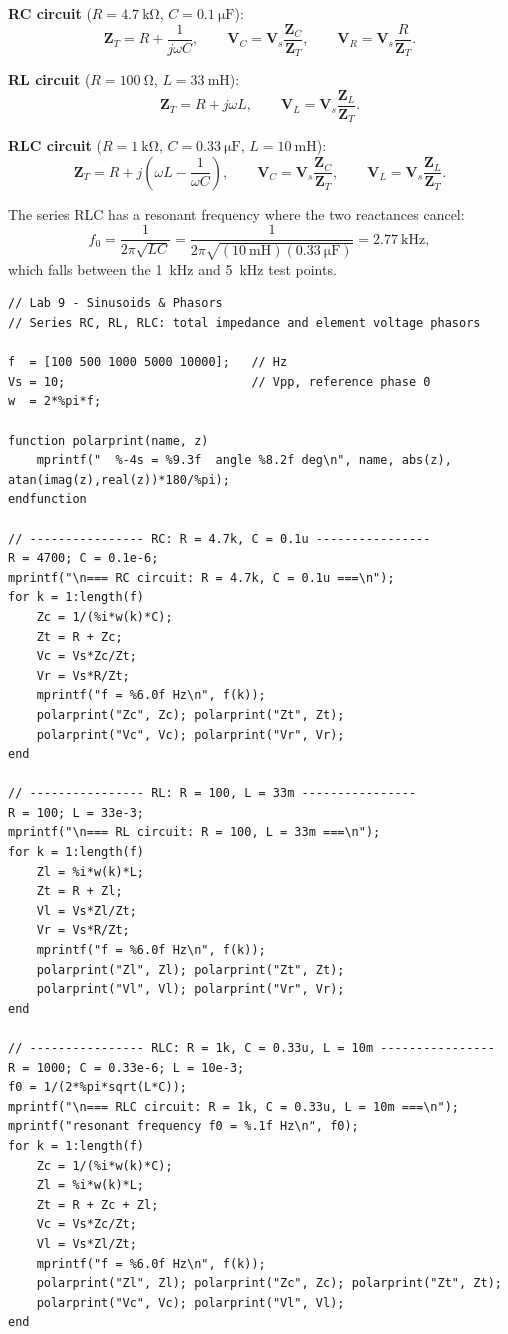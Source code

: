 \documentclass[11pt]{article}
\begin{document}
\noindent\textbf{RC circuit} ($R = \SI{4.7}{\kilo\ohm}$, $C = \SI{0.1}{\micro\farad}$):
\[
    \mathbf{Z}_T = R + \frac{1}{j\omega C},
    \qquad
    \mathbf{V}_C = \mathbf{V}_s \frac{\mathbf{Z}_C}{\mathbf{Z}_T},
    \qquad
    \mathbf{V}_R = \mathbf{V}_s \frac{R}{\mathbf{Z}_T}.
\]

\noindent\textbf{RL circuit} ($R = \SI{100}{\ohm}$, $L = \SI{33}{\milli\henry}$):
\[
    \mathbf{Z}_T = R + j\omega L,
    \qquad
    \mathbf{V}_L = \mathbf{V}_s \frac{\mathbf{Z}_L}{\mathbf{Z}_T}.
\]

\noindent\textbf{RLC circuit} ($R = \SI{1}{\kilo\ohm}$, $C = \SI{0.33}{\micro\farad}$,
$L = \SI{10}{\milli\henry}$):
\[
    \mathbf{Z}_T = R + j\!\left(\omega L - \frac{1}{\omega C}\right),
    \qquad
    \mathbf{V}_C = \mathbf{V}_s \frac{\mathbf{Z}_C}{\mathbf{Z}_T},
    \qquad
    \mathbf{V}_L = \mathbf{V}_s \frac{\mathbf{Z}_L}{\mathbf{Z}_T}.
\]

The series RLC has a resonant frequency where the two reactances cancel:
\[
    f_0 = \frac{1}{2\pi\sqrt{LC}}
        = \frac{1}{2\pi\sqrt{(\SI{10}{\milli\henry})(\SI{0.33}{\micro\farad})}}
        = \SI{2.77}{\kilo\hertz},
\]
which falls between the \SI{1}{\kilo\hertz} and \SI{5}{\kilo\hertz} test points.

\begin{lstlisting}[style=scilab, caption={SciLab program: theoretical impedances and phasor voltages}]
// Lab 9 - Sinusoids & Phasors
// Series RC, RL, RLC: total impedance and element voltage phasors

f  = [100 500 1000 5000 10000];   // Hz
Vs = 10;                          // Vpp, reference phase 0
w  = 2*%pi*f;

function polarprint(name, z)
    mprintf("  %-4s = %9.3f  angle %8.2f deg\n", name, abs(z), atan(imag(z),real(z))*180/%pi);
endfunction

// ---------------- RC: R = 4.7k, C = 0.1u ----------------
R = 4700; C = 0.1e-6;
mprintf("\n=== RC circuit: R = 4.7k, C = 0.1u ===\n");
for k = 1:length(f)
    Zc = 1/(%i*w(k)*C);
    Zt = R + Zc;
    Vc = Vs*Zc/Zt;
    Vr = Vs*R/Zt;
    mprintf("f = %6.0f Hz\n", f(k));
    polarprint("Zc", Zc); polarprint("Zt", Zt);
    polarprint("Vc", Vc); polarprint("Vr", Vr);
end

// ---------------- RL: R = 100, L = 33m ----------------
R = 100; L = 33e-3;
mprintf("\n=== RL circuit: R = 100, L = 33m ===\n");
for k = 1:length(f)
    Zl = %i*w(k)*L;
    Zt = R + Zl;
    Vl = Vs*Zl/Zt;
    Vr = Vs*R/Zt;
    mprintf("f = %6.0f Hz\n", f(k));
    polarprint("Zl", Zl); polarprint("Zt", Zt);
    polarprint("Vl", Vl); polarprint("Vr", Vr);
end

// ---------------- RLC: R = 1k, C = 0.33u, L = 10m ----------------
R = 1000; C = 0.33e-6; L = 10e-3;
f0 = 1/(2*%pi*sqrt(L*C));
mprintf("\n=== RLC circuit: R = 1k, C = 0.33u, L = 10m ===\n");
mprintf("resonant frequency f0 = %.1f Hz\n", f0);
for k = 1:length(f)
    Zc = 1/(%i*w(k)*C);
    Zl = %i*w(k)*L;
    Zt = R + Zc + Zl;
    Vc = Vs*Zc/Zt;
    Vl = Vs*Zl/Zt;
    mprintf("f = %6.0f Hz\n", f(k));
    polarprint("Zl", Zl); polarprint("Zc", Zc); polarprint("Zt", Zt);
    polarprint("Vc", Vc); polarprint("Vl", Vl);
end
\end{lstlisting}
\end{document}
